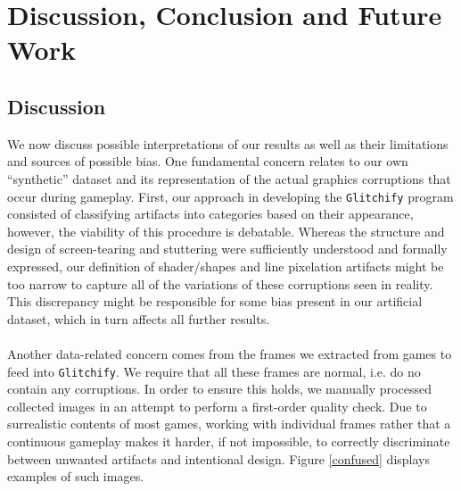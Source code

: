 \chapter{Discussion, Conclusion and Future Work}\label{Ch:discussion}

\section{Discussion}
We now discuss possible interpretations of our results as well as their limitations and sources of possible bias. One fundamental concern relates to our own ``synthetic'' dataset and its representation of the actual graphics corruptions that occur during gameplay. First, our approach in developing the \texttt{Glitchify} program consisted of classifying artifacts into categories based on their appearance, however, the viability of this procedure is debatable. Whereas the structure and design of screen-tearing and stuttering were sufficiently understood and formally expressed, our definition of shader/shapes and line pixelation artifacts might be too narrow to capture all of the variations of these corruptions seen in reality. This discrepancy might be responsible for some bias present in our artificial dataset, which in turn affects all further results.\\\hspace{\fill}\\
Another data-related concern comes from the frames we extracted from games to feed into \texttt{Glitchify}. We require that all these frames are normal, i.e. do no contain any corruptions. In order to ensure this holds, we manually processed collected images in an attempt to perform a first-order quality check. Due to surrealistic contents of most games, working with individual frames rather that a continuous gameplay makes it harder, if not impossible, to correctly discriminate between unwanted artifacts and intentional design. Figure \ref{confused} displays examples of such images.
